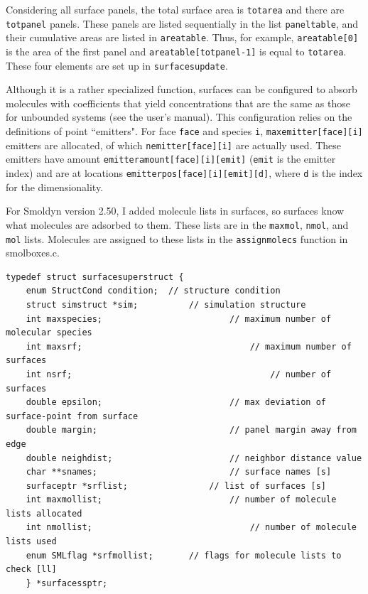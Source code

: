 \documentclass {scrbook}
\newcommand {\ttt} {\texttt}
\begin{document}
Considering all surface panels, the total surface area is \ttt{totarea} and there are \ttt{totpanel} panels. These panels are listed sequentially in the list \ttt{paneltable}, and their cumulative areas are listed in \ttt{areatable}. Thus, for example, \ttt{areatable[0]} is the area of the first panel and \ttt{areatable[totpanel-1]} is equal to \ttt{totarea}. These four elements are set up in \ttt{surfacesupdate}.

Although it is a rather specialized function, surfaces can be configured to absorb molecules with coefficients that yield concentrations that are the same as those for unbounded systems (see the user's manual). This configuration relies on the definitions of point ``emitters". For face \ttt{face} and species \ttt{i}, \ttt{maxemitter[face][i]} emitters are allocated, of which \ttt{nemitter[face][i]} are actually used. These emitters have amount \ttt{emitteramount[face][i][emit]} (\ttt{emit} is the emitter index) and are at locations \ttt{emitterpos[face][i][emit][d]}, where \ttt{d} is the index for the dimensionality.

For Smoldyn version 2.50, I added molecule lists in surfaces, so surfaces know what molecules are adsorbed to them. These lists are in the \ttt{maxmol}, \ttt{nmol}, and \ttt{mol} lists. Molecules are assigned to these lists in the \ttt{assignmolecs} function in smolboxes.c.

\begin{lstlisting}
typedef struct surfacesuperstruct {
	enum StructCond condition;	// structure condition
	struct simstruct *sim;			// simulation structure
	int maxspecies;							// maximum number of molecular species
	int maxsrf;									// maximum number of surfaces
	int nsrf;										// number of surfaces
	double epsilon;							// max deviation of surface-point from surface
	double margin;							// panel margin away from edge
	double neighdist;						// neighbor distance value
	char **snames;							// surface names [s]
	surfaceptr *srflist;				// list of surfaces [s]
	int maxmollist;							// number of molecule lists allocated
	int nmollist;								// number of molecule lists used
	enum SMLflag *srfmollist;		// flags for molecule lists to check [ll]
	} *surfacessptr;
\end{lstlisting}
\end{document}
